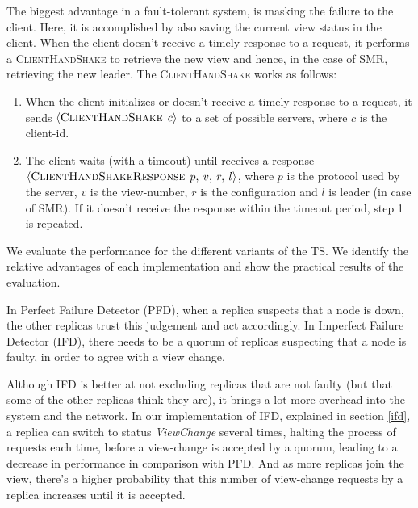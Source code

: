 \documentclass[times, 10pt,twocolumn]{article}
\begin{document}
 \label{client_failure}
The biggest advantage in a fault-tolerant system, is masking the failure to the client. 
Here, it is accomplished by also saving the current view status in the client.
When the client doesn't receive  a timely response to a request, it performs a 
\textsc{ClientHandShake} to retrieve the new view and hence, in the case of SMR, retrieving the new leader. The \textsc{ClientHandShake} works as follows:
\begin{enumerate}
  \item When the client initializes or doesn't receive a timely response to a request, it sends
  $\left \langle \textsc{ClientHandShake} \: \: c \right \rangle$ to a set of possible servers,
  where $c$ is the client-id.
  
  \item The client waits (with a timeout) until receives a response 
  $\left \langle \textsc{ClientHandShakeResponse} \: \: p, \: v, \: r, \: l \right \rangle$,
  where $p$ is the protocol used by the server, $v$ is the view-number, $r$ is the configuration
  and $l$ is leader (in case of SMR). If it doesn't receive the response within the timeout period,
  step 1 is repeated.
\end{enumerate}

 \label{evaluation}
We evaluate the performance for the different variants of the TS. We identify the relative
advantages of each implementation and show the practical results of the evaluation.

In Perfect Failure Detector (PFD), when a replica suspects that a node is down, the other replicas 
trust this judgement and act accordingly. In Imperfect Failure Detector (IFD), there needs to be a quorum
of replicas suspecting that a node is faulty, in order to agree with a view change.

Although IFD is better at not excluding replicas that are not faulty (but that some of the other replicas think they are),
it brings a lot more overhead into the system and the network. In our implementation of IFD, 
explained in section \ref{ifd}, a replica can switch to status \textit{ViewChange} several times, halting 
the process of requests each time, before a view-change is accepted by a quorum, leading to a 
decrease in performance in comparison with PFD. And as more replicas join the view, there's a higher probability that this number of view-change requests by a replica increases until it is accepted.
\end{document}
